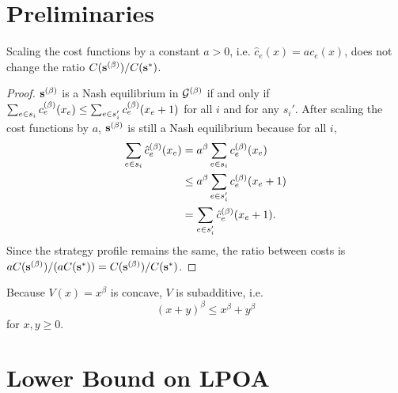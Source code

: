 \documentclass[twoside]{article}
\begin{document}
\begin{multicols}{2}
\section{Preliminaries}
\begin{lem} \label{lem:scale}
  Scaling the cost functions by a constant $a > 0$, i.e. $\hat c_e(x) = a
  c_e(x)$, does not change the ratio $C(\mathbf{s}^{(\beta)})/C(\mathbf{s}^*)$.
\end{lem}
\begin{proof}
  $\mathbf{s}^{(\beta)}$ is a Nash equilibrium in $\mathcal{G}^{(\beta)}$ if and only if $\sum_{e
  \in s_i} c_e^{(\beta)}(x_e) \le \sum_{e \in s_i'} c_e^{(\beta)}(x_e + 1)$ for all $i$
  and for any $s_i'$. After scaling the cost functions by $a$, $\mathbf{s}^{(\beta)}$ is
  still a Nash equilibrium because for all $i$,
  \begin{align*}
    \sum_{e \in s_i} \hat c_e^{(\beta)}(x_e) &= a^\beta \sum_{e \in s_i}
    c_e^{(\beta)}(x_e) \\
    &\le a^\beta \sum_{e \in s_i'} c_e^{(\beta)}(x_e + 1) \\
    &= \sum_{e \in s_i'} \hat c_e^{(\beta)}(x_e+1).
  \end{align*}
  Since the strategy profile remains the same, the ratio between costs is $a
  C(\mathbf{s}^{(\beta)})/(a C(\mathbf{s}^*)) = C(\mathbf{s}^{(\beta)})/C(\mathbf{s}^*)$.
\end{proof}

Because $V(x) = x^\beta$ is concave, $V$ is subadditive, i.e.
\begin{equation}
  (x+y)^\beta \le x^\beta + y^\beta
  \label{eq:subadditive}
\end{equation}
for $x,y \ge 0$.

\section{Lower Bound on LPOA} \label{sec:lb}
\begin{figure}[H]
  \centering
  \begin{subfigure}[b]{\linewidth}
    \centering
\end{subfigure}
\end{figure}
\end{multicols}
\end{document}
